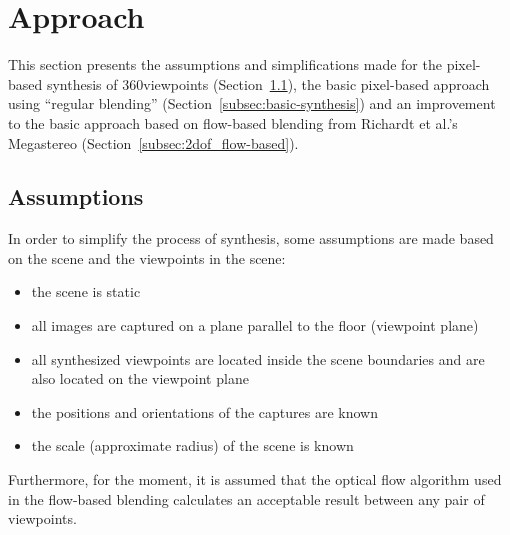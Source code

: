 
\section{Approach} \label{sec:approach}
This section presents the assumptions and simplifications made for the pixel-based synthesis of 360\degree viewpoints (Section~\ref{subsec:assumptions}), the basic pixel-based approach using ``regular blending'' (Section~\ref{subsec:basic-synthesis}) and an improvement to the basic approach based on flow-based blending from Richardt et al.'s Megastereo \cite{megastereo} (Section~\ref{subsec:2dof_flow-based}).

\subsection{Assumptions}\label{subsec:assumptions}
In order to simplify the process of synthesis, some assumptions are made based on the scene and the viewpoints in the scene:

\begin{itemize}
  \item the scene is static
  \item all images are captured on a plane parallel to the floor (viewpoint plane)
  \item all synthesized viewpoints are located inside the scene boundaries and are also located on the viewpoint plane
  \item the positions and orientations of the captures are known
  \item the scale (approximate radius) of the scene is known
\end{itemize}

Furthermore, for the moment, it is assumed that the optical flow algorithm used in the flow-based blending calculates an acceptable result between any pair of viewpoints.

